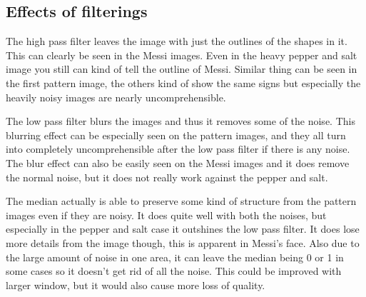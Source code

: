 \documentclass{article}
\begin{document}

\subsection{Effects of filterings}

The high pass filter leaves the image with just the outlines of the shapes in it. This can clearly be seen in the Messi images. Even in the heavy pepper and salt image you still can kind of tell the outline of Messi. Similar thing can be seen in the first pattern image, the others kind of show the same signs but especially the heavily noisy images are nearly uncomprehensible.

The low pass filter blurs the images and thus it removes some of the noise. This blurring effect can be especially seen on the pattern images, and they all turn into completely uncomprehensible after the low pass filter if there is any noise. The blur effect can also be easily seen on the Messi images and it does remove the normal noise, but it does not really work against the pepper and salt.

The median actually is able to preserve some kind of structure from the pattern images even if they are noisy. It does quite well with both the noises, but especially in the pepper and salt case it outshines the low pass filter. It does lose more details from the image though, this is apparent in Messi's face. Also due to the large amount of noise in one area, it can leave the median being 0 or 1 in some cases so it doesn't get rid of all the noise. This could be improved with larger window, but it would also cause more loss of quality.
\end{document}
